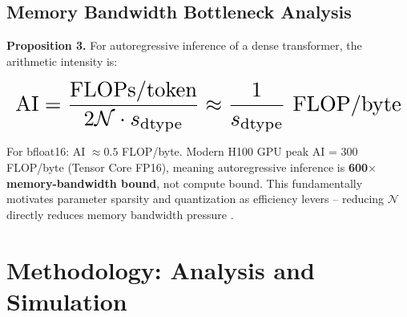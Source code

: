 \documentclass[10pt,journal,compsoc,twocolumn]{IEEEtran}
\begin{document}
\subsection{Memory Bandwidth Bottleneck Analysis}


\textbf{Proposition 3.} For autoregressive inference of a dense transformer, the arithmetic intensity is:

























\begin{equation}
\resizebox{\columnwidth}{!}{$\displaystyle
\begin{aligned}
\text{AI} = \frac{\text{FLOPs/token}}{2\mathcal{N} \cdot s_{\text{dtype}}} \approx \frac{1}{s_{\text{dtype}}} \text{ FLOP/byte}
\end{aligned}
$}
\end{equation}

























For bfloat16: AI $\approx 0.5$ FLOP/byte. Modern H100 GPU peak AI = 300 FLOP/byte (Tensor Core FP16), meaning autoregressive inference is \textbf{600$\times$ memory-bandwidth bound}, not compute bound. This fundamentally motivates parameter sparsity and quantization as efficiency levers -- reducing $\mathcal{N}$ directly reduces memory bandwidth pressure \cite{arxiv_2406_00584}.




\section{Methodology: Analysis and Simulation}
\end{document}
